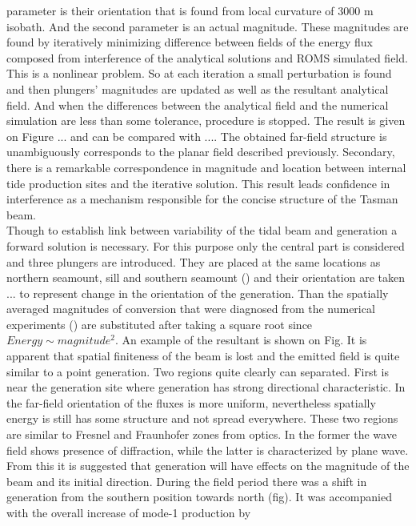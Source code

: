 \documentclass[12pt]{article}
\begin{document}
parameter is their orientation that is found from local curvature of $3000$ m isobath. 
And the second parameter is an actual magnitude.  These magnitudes are found by iteratively 
minimizing difference between fields of the energy flux composed from interference of the 
analytical solutions and ROMS simulated field. This is a nonlinear problem. So at each iteration a 
small perturbation is found and then plungers' magnitudes are updated as well as the resultant 
analytical field. And when the differences between the analytical field and the numerical 
simulation are less than some tolerance, procedure is stopped. The result is given on Figure ... 
and can be compared with .... The obtained far-field structure is unambiguously corresponds to the 
planar field described previously. Secondary, there is a remarkable correspondence in magnitude and 
location between internal tide production sites and the iterative solution. This result leads 
confidence in interference as a mechanism responsible for the concise structure of the Tasman 
beam.\\
Though to establish link between variability of the tidal beam and generation a forward solution is 
necessary. For this purpose only the central part is considered and three plungers are introduced. 
They are placed at the same locations as northern seamount, sill and southern seamount () and their 
orientation are taken ... to represent change in the orientation of the generation. Than the 
spatially averaged magnitudes of conversion that were diagnosed from the numerical experiments () 
are substituted after taking a square root since $Energy \sim magnitude^2$. An example of the 
resultant is shown on Fig. It is apparent that spatial finiteness of the beam is lost and the 
emitted field is quite similar to a point generation. Two regions quite clearly can separated. 
First is near the generation site where generation has strong directional characteristic. In the 
far-field orientation of the fluxes is more uniform, nevertheless spatially energy is still has 
some structure and not spread everywhere. These two regions are similar to Fresnel and Fraunhofer 
zones from optics. In the former the wave field shows presence of diffraction, while the latter is 
characterized by plane wave.\\
From this it is suggested that generation will have effects on the magnitude of the beam and its 
initial direction. During the field period there was a shift in generation from the southern 
position towards north (fig). It was accompanied with the overall increase of mode-1 production by 
\end{document}
